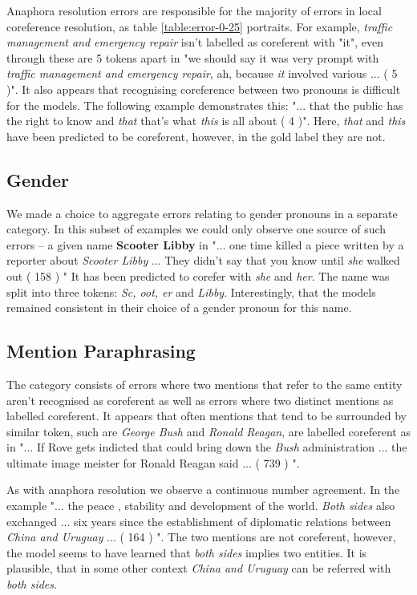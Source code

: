 \documentclass[11pt]{article}
\begin{document}
Anaphora resolution errors are responsible for the majority of errors in local coreference resolution, as table \ref{table:error-0-25} portraits. For example, \textit{traffic management and emergency repair} isn't labelled as coreferent with "it", even through these are 5 tokens apart in "we should say it was very prompt with \textit{traffic management and emergency repair}, ah, because \textit{it} involved various ... ( 5 )". It also appears that recognising coreference between two pronouns is difficult for the models. The following example demonstrates this: "... that the public has the right to know and \textit{that} that's what \textit{this} is all about ( 4 )". Here, \textit{that} and \textit{this} have been predicted to be coreferent, however, in the gold label they are not.

\subsection{Gender}
We made a choice to aggregate errors relating to gender pronouns in a separate category. In this subset of examples we could only observe one source of such errors -- a given name \textbf{Scooter Libby} in "... one time killed a piece written by a reporter about \textit{Scooter Libby} ... They didn't say that you know until \textit{she} walked out ( 158 ) " It has been predicted to corefer with \textit{she} and \textit{her}. The name was split into three tokens: \textit{Sc, oot, er} and \textit{Libby}. Interestingly, that the models remained consistent in their choice of a gender pronoun for this name. 


\subsection{Mention Paraphrasing} The category consists of errors where two mentions that refer to the same entity aren't recognised as coreferent as well as errors where two distinct mentions as labelled coreferent. It appears that often mentions that tend to be surrounded by similar token, such are \textit{George Bush} and \textit{Ronald Reagan}, are labelled coreferent as in "... If Rove gets indicted that could bring down the \textit{Bush} administration ... the ultimate image meister for Ronald Reagan said ... ( 739 ) ". 

As with anaphora resolution we observe a continuous number agreement. In the example "... the peace , stability and development of the world. \textit{Both sides} also exchanged ... six years since the establishment of diplomatic relations between \textit{China and Uruguay} ... ( 164 ) ". The two mentions are not coreferent, however, the model seems to have learned that \textit{both sides} implies two entities. It is plausible, that in some other context \textit{China and Uruguay} can be referred with \textit{both sides}.
\end{document}
